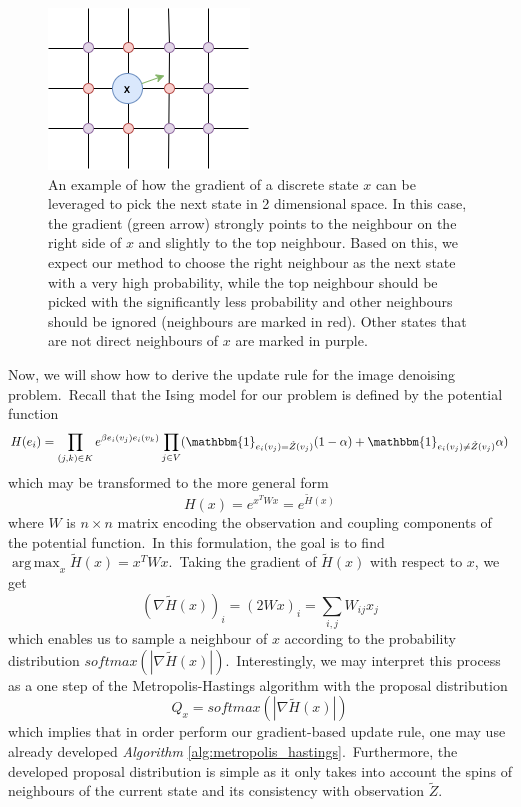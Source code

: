 \documentclass[a4paper, 11pt, onecolumn, openany, titlepage]{report}
\theoremstyle{default_theorem_style}\newtheorem{theorem}{Theorem}
\theoremstyle{default_theorem_style}\newtheorem{definition}{Definition}
\DeclareMathOperator*{\argmax}{arg\,max}
\begin{document}
\begin{figure}[H]
\centering
\includegraphics[scale=0.8]{gradient_example}
\caption{An example of how the gradient of a discrete state $x$ can be leveraged to pick the next state in 2
dimensional space. In this case, the gradient (green arrow) strongly points to the neighbour on the right side
of $x$ and slightly to the top neighbour. Based on this, we expect our method to choose the right neighbour as the
next state with a very high probability, while the top neighbour should be picked with the significantly less
probability and other neighbours should be ignored (neighbours are marked in red). Other states that are not direct
neighbours of $x$ are marked in purple.}
\label{fig:gradient_example}
\end{figure}

Now, we will show how to derive the update rule for the image denoising problem.\ Recall that the Ising model
for our problem is defined by the potential function
$$
H(e_i) = \prod\limits_{(j, k) \in K} e^{\beta e_i(v_j)e_i(v_k)}
\prod\limits_{j \in V}( \mathbbm{1}_{e_i(v_j) = \tilde{Z}(v_j)}(1 - \alpha) +
\mathbbm{1}_{e_i(v_j) \neq \tilde{Z}(v_j)}\alpha)
$$
which may be transformed to the more general form
$$
H(x) = e^{x^T W x} = e^{\tilde{H}(x)}
$$
where $W$ is $n \times n$ matrix encoding the observation and coupling components of the potential function.\ In
this formulation, the goal is to find $\argmax_x \tilde{H}(x) = x^T W x$.\ Taking the gradient of
$\tilde{H}(x)$ with respect to $x$, we get
$$
(\nabla \tilde{H}(x))_i = (2W x)_i = \sum_{i, j} W_{ij} x_j
$$
which enables us to sample a neighbour of $x$ according to the probability distribution
$softmax(|\nabla \tilde{H}(x)|)$.\ Interestingly, we may interpret this process as a one step of the
Metropolis-Hastings algorithm with the proposal distribution
$$
Q_x = softmax(|\nabla \tilde{H}(x)|)
$$
which implies that in order perform our gradient-based update rule, one may use already developed
\textit{Algorithm} \ref{alg:metropolis_hastings}.\ Furthermore, the developed proposal distribution is simple as
it only takes into account the spins of neighbours of the current state and its consistency with observation
$\tilde{Z}$.
\end{document}
